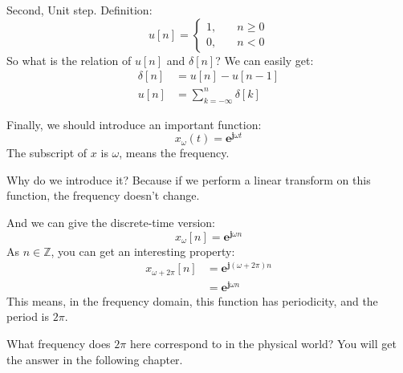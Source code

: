     Second, Unit step. Definition:
        \begin{equation}
            u[n] = 
            \left\{
            \begin{aligned}
                1, \quad & n \geq 0\\
                0, \quad & n < 0
            \end{aligned}
            \right.
        \end{equation}
    So what is the relation of $u[n]$ and $\delta[n]$? We can easily get:
        \begin{equation}
            \begin{aligned}
                \delta[n] &= u[n] - u[n-1] \\
                u[n]      &= \sum_{k=-\infty}^{n}\delta[k]
            \end{aligned}
        \end{equation}
    
    Finally, we should introduce an important function:
        \begin{equation}
            x_{\omega}(t) = \mathbf{e}^{\mathbf{j}\omega t}
        \end{equation}
    The subscript of $x$ is $\omega$, means the frequency.

    Why do we introduce it? Because if we perform a linear transform on this function, the frequency doesn't change.
    
    And we can give the discrete-time version:
        \begin{equation}
            x_{\omega}[n] = \mathbf{e}^{\mathbf{j}\omega n}
        \end{equation}
    As $n \in \mathbb{Z}$, you can get an interesting property:
        \begin{equation}
            \begin{aligned}
            x_{\omega + 2\pi}[n] &= \mathbf{e}^{\mathbf{j}(\omega+2\pi) n}\\
                                 &= \mathbf{e}^{\mathbf{j}\omega n}
            \end{aligned}
        \end{equation}
    This means, in the frequency domain, this function has periodicity, 
    and the period is $2\pi$.

    What frequency does $2\pi$ here correspond to in the physical world? You will get the answer in the following chapter.

